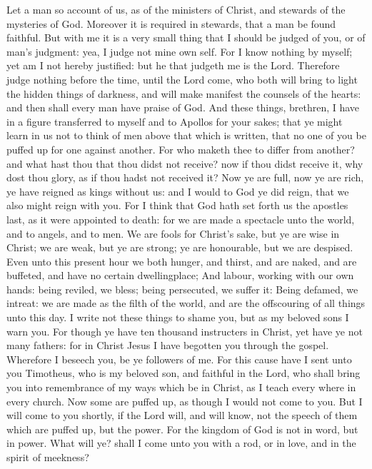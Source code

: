  Let a man so account of us, as of the ministers of Christ,
and stewards of the mysteries of God.  Moreover it is
required in stewards, that a man be found faithful.  But
with me it is a very small thing that I should be judged of you, or of
man's judgment: yea, I judge not mine own self.  For I know
nothing by myself; yet am I not hereby justified: but he that judgeth me
is the Lord.  Therefore judge nothing before the time, until
the Lord come, who both will bring to light the hidden things of
darkness, and will make manifest the counsels of the hearts: and then
shall every man have praise of God.  And these things,
brethren, I have in a figure transferred to myself and to Apollos for
your sakes; that ye might learn in us not to think of men above that
which is written, that no one of you be puffed up for one against
another.  For who maketh thee to differ from another? and
what hast thou that thou didst not receive? now if thou didst receive
it, why dost thou glory, as if thou hadst not received it? 
Now ye are full, now ye are rich, ye have reigned as kings without us:
and I would to God ye did reign, that we also might reign with you.
 For I think that God hath set forth us the apostles last,
as it were appointed to death: for we are made a spectacle unto the
world, and to angels, and to men.  We are fools for
Christ's sake, but ye are wise in Christ; we are weak, but ye are
strong; ye are honourable, but we are despised.  Even unto
this present hour we both hunger, and thirst, and are naked, and are
buffeted, and have no certain dwellingplace;  And labour,
working with our own hands: being reviled, we bless; being persecuted,
we suffer it:  Being defamed, we intreat: we are made as
the filth of the world, and are the offscouring of all things unto this
day.  I write not these things to shame you, but as my
beloved sons I warn you.  For though ye have ten thousand
instructers in Christ, yet have ye not many fathers: for in Christ Jesus
I have begotten you through the gospel.  Wherefore I
beseech you, be ye followers of me.  For this cause have I
sent unto you Timotheus, who is my beloved son, and faithful in the
Lord, who shall bring you into remembrance of my ways which be in
Christ, as I teach every where in every church.  Now some
are puffed up, as though I would not come to you.  But I
will come to you shortly, if the Lord will, and will know, not the
speech of them which are puffed up, but the power.  For the
kingdom of God is not in word, but in power.  What will ye?
shall I come unto you with a rod, or in love, and in the spirit of
meekness?

